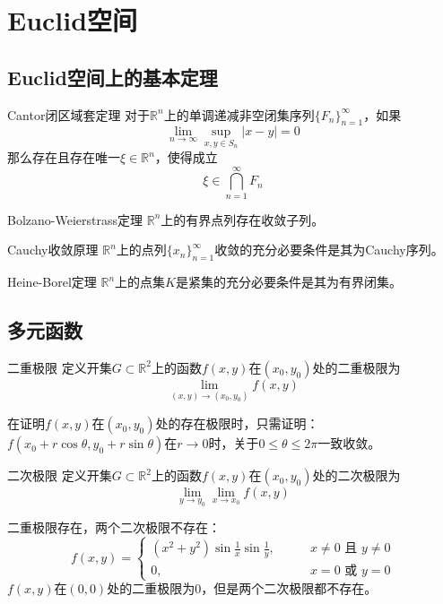 \documentclass[lang = cn, scheme = chinese, thmcnt = section]{elegantbook}
\newcommand{\R}{\mathbb{R}}            %
\newcommand{\sub}{\subset}             %
\begin{document}
\chapter{Euclid空间}

\section{Euclid空间上的基本定理}

\begin{theorem}{Cantor闭区域套定理}
	对于$\R^n$上的单调递减非空闭集序列$\{F_n\}_{n=1}^{\infty}$，如果
	$$
	\lim_{n\to\infty}\sup_{x,y\in S_n}|x-y|=0
	$$
	那么存在且存在唯一$\xi\in\R^n$，使得成立
	$$
	\xi\in\bigcap_{n=1}^{\infty}F_n
	$$
\end{theorem}

\begin{theorem}{Bolzano-Weierstrass定理}
	$\R^n$上的有界点列存在收敛子列。
\end{theorem}

\begin{theorem}{Cauchy收敛原理}
	$\R^n$上的点列$\{x_n\}_{n=1}^{\infty}$收敛的充分必要条件是其为Cauchy序列。
\end{theorem}

\begin{theorem}{Heine-Borel定理}
	$\R^n$上的点集$K$是紧集的充分必要条件是其为有界闭集。
\end{theorem}

\section{多元函数}

\begin{definition}{二重极限}
	定义开集$G\sub\R^2$上的函数$f(x,y)$在$(x_0,y_0)$处的二重极限为
	$$
	\lim_{(x,y)\to (x_0,y_0)}f(x,y)
	$$
\end{definition}

\begin{note}
	在证明$f(x,y)$在$(x_0,y_0)$处的存在极限时，只需证明：$f(x_0+r\cos\theta,y_0+r\sin\theta)$在$r\to 0$时，关于$0\le \theta \le 2\pi$一致收敛。
\end{note}

\begin{definition}{二次极限}
	定义开集$G\sub\R^2$上的函数$f(x,y)$在$(x_0,y_0)$处的二次极限为
	$$
	\lim_{y\to y_0}\lim_{x\to x_0}f(x,y)
	$$
\end{definition}

\begin{example}
	二重极限存在，两个二次极限不存在：
	$$
	f(x,y)=
	\begin{cases}
		(x^2+y^2)\sin\frac{1}{x}\sin\frac{1}{y},\qquad & x\ne 0\text{ 且 }y\ne 0\\
		0,\qquad & x= 0\text{ 或 }y=0
	\end{cases}
	$$
	$f(x,y)$在$(0,0)$处的二重极限为$0$，但是两个二次极限都不存在。
\end{example}
\end{document}
